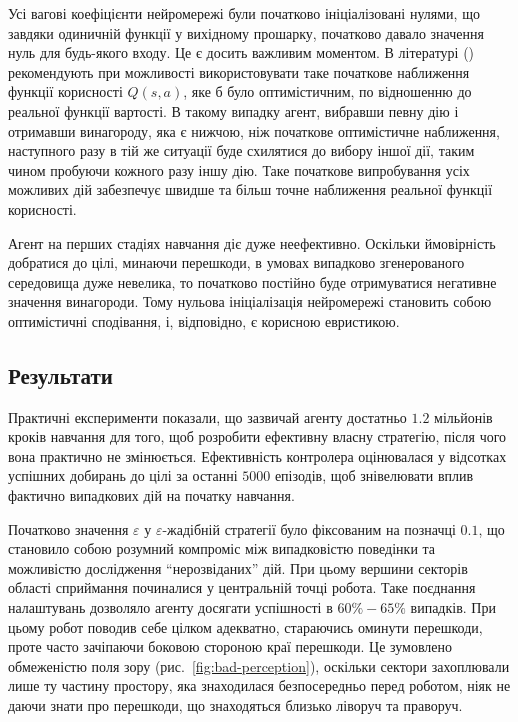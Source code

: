 \documentclass[a4paper,10pt,fleqn]{article}
\begin{document}
Усі вагові коефіцієнти нейромережі були початково ініціалізовані нулями, що завдяки одиничній функції у вихідному прошарку, початково давало значення нуль для будь-якого входу. Це є досить важливим моментом. В літературі (\cite{SuttonBarto2002}) рекомендують при можливості використовувати таке початкове наближення функції корисності $Q(s,a)$, яке б було оптимістичним, по відношенню до реальної функції вартості. В такому випадку агент, вибравши певну дію і отримавши винагороду, яка є нижчою, ніж початкове оптимістичне наближення, наступного разу в тій же ситуації буде схилятися до вибору іншої дії, таким чином пробуючи кожного разу іншу дію. Таке початкове випробування усіх можливих дій забезпечує швидше та більш точне наближення реальної функції корисності. 

Агент на перших стадіях навчання діє дуже неефективно. Оскільки ймовірність добратися до цілі, минаючи перешкоди, в умовах випадково згенерованого середовища дуже невелика, то початково постійно буде отримуватися негативне значення винагороди. Тому нульова ініціалізація нейромережі становить собою оптимістичні сподівання, і, відповідно, є корисною евристикою.

\subsection{Результати}

Практичні експерименти показали, що зазвичай агенту достатньо $1.2$ мільйонів кроків навчання для того, щоб розробити ефективну власну стратегію, після чого вона практично не змінюється. Ефективність контролера оцінювалася у відсотках успішних добирань до цілі за останні $5000$ епізодів, щоб знівелювати вплив фактично випадкових дій на початку навчання.

Початково значення $\varepsilon$ у $\varepsilon$-жадібній стратегії було фіксованим на позначці $0.1$, що становило собою розумний компроміс між випадковістю поведінки та можливістю дослідження ``нерозвіданих'' дій. При цьому вершини секторів області сприймання починалися у центральній точці робота. Таке поєднання налаштувань дозволяло агенту досягати успішності в $60\%-65\%$ випадків. При цьому робот поводив себе цілком адекватно, стараючись оминути перешкоди, проте часто зачіпаючи боковою стороною краї перешкоди. Це зумовлено обмеженістю поля зору (рис.~\ref{fig:bad-perception}), оскільки сектори захоплювали лише ту частину простору, яка знаходилася безпосередньо перед роботом, ніяк не даючи знати про перешкоди, що знаходяться близько ліворуч та праворуч.
\end{document}
